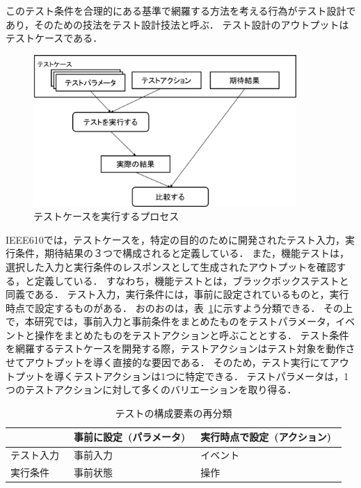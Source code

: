 このテスト条件を合理的にある基準で網羅する方法を考える行為がテスト設計であり，そのための技法をテスト設計技法と呼ぶ．
テスト設計のアウトプットはテストケースである．

\begin{figure}[h]
  \begin{center}
  \includegraphics[width=10cm]{./image/D-2-FigTCS.png}
  \caption{テストケースを実行するプロセス}
  \label{fig:D-4-FigTCS}
  \end{center}
\end{figure}

IEEE610では，テストケースを，特定の目的のために開発されたテスト入力，実行条件，期待結果の３つで構成されると定義している．
また，機能テストは，選択した入力と実行条件のレスポンスとして生成されたアウトプットを確認する，と定義している\cite{IEEE610}．
すなわち，機能テストとは，ブラックボックステストと同義である．
テスト入力，実行条件には，事前に設定されているものと，実行時点で設定するものがある．
おのおのは，表~\ref{tab:D-4-FigTPS}に示すよう分類できる．
その上で，本研究では，事前入力と事前条件をまとめたものをテストパラメータ，イベントと操作をまとめたものをテストアクションと呼ぶこととする\cite{yumoto2013-a}．
テスト条件を網羅するテストケースを開発する際，テストアクションはテスト対象を動作させてアウトプットを導く直接的な要因である．
そのため，テスト実行にてアウトプットを導くテストアクションは1つに特定できる．
テストパラメータは，1つのテストアクションに対して多くのバリエーションを取り得る．

\begin{table}[htbp]
  \centering
  \caption{テストの構成要素の再分類}
    \begin{tabular}{|l|l|l|}
    \hline
          & 事前に設定 (パラメータ)  & 実行時点で設定 (アクション)  \bigstrut\\
    \hline
    テスト入力  & 事前入力  & イベント  \bigstrut\\
    \hline
    実行条件  & 事前状態  & 操作  \bigstrut\\
    \hline
    \end{tabular}%
  \label{tab:D-4-FigTPS}%
\end{table}%

